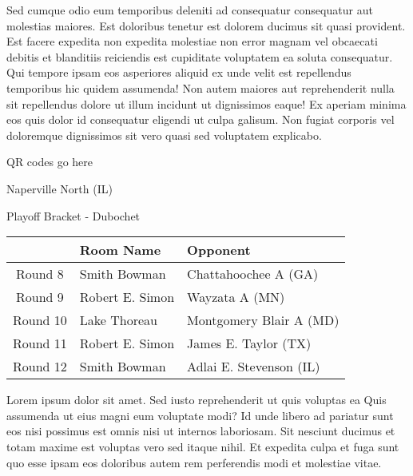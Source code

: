 \documentclass{article}%
\begin{document}
Sed cumque odio eum temporibus deleniti ad consequatur consequatur aut molestias maiores. Est doloribus tenetur est dolorem ducimus sit quasi provident. Est facere expedita non expedita molestiae non error magnam vel obcaecati debitis et blanditiis reiciendis est cupiditate voluptatem ea soluta consequatur. Qui tempore ipsam eos asperiores aliquid ex unde velit est repellendus temporibus hic quidem assumenda!\newline%
\newline%
Non autem maiores aut reprehenderit nulla sit repellendus dolore ut illum incidunt ut dignissimos eaque! Ex aperiam minima eos quis dolor id consequatur eligendi ut culpa galisum. Non fugiat corporis vel doloremque dignissimos sit vero quasi sed voluptatem explicabo.\newline%
\newline%
%
\vspace*{30pt}%
\begin{center}%
\begin{Huge}%
QR codes go here%
\end{Huge}%
\end{center}%
\newpage%
\begin{center}%
\begin{Huge}%
Naperville North (IL)%
\end{Huge}%
\vspace*{8pt}%
\linebreak%
\begin{Large}%
Playoff Bracket {-} Dubochet%
\end{Large}%
\end{center}%
%
\begin{tabularx}{\textwidth}{|c|Y|Y|}%
\hline%
&Room Name&Opponent\\%
\hline%
Round 8&Smith Bowman&Chattahoochee A (GA)\\%
Round 9&Robert E. Simon&Wayzata A (MN)\\%
Round 10&Lake Thoreau&Montgomery Blair A (MD)\\%
Round 11&Robert E. Simon&James E. Taylor (TX)\\%
Round 12&Smith Bowman&Adlai E. Stevenson (IL)\\%
\hline%
\end{tabularx}%
\vspace*{8pt}%
\linebreak%
\newline%
\newline%
Lorem ipsum dolor sit amet. Sed iusto reprehenderit ut quis voluptas ea Quis assumenda ut eius magni eum voluptate modi? Id unde libero ad pariatur sunt eos nisi possimus est omnis nisi ut internos laboriosam. Sit nesciunt ducimus et totam maxime est voluptas vero sed itaque nihil. Et expedita culpa et fuga sunt quo esse ipsam eos doloribus autem rem perferendis modi et molestiae vitae.\newline%
\end{document}
